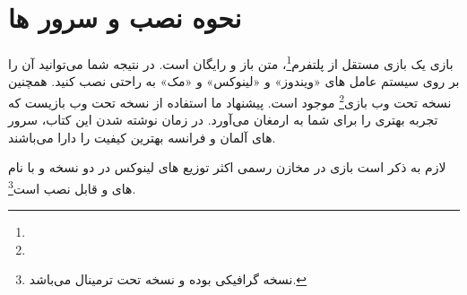 \chapter*{نحوه نصب و سرور ها}

بازی  یک بازی مستقل از پلتفرم\footnote{}، متن باز و رایگان است. در نتیجه شما می‌توانید آن را بر روی سیستم عامل های «ویندوز» و «لینوکس» و «مک» به راحتی نصب کنید. همچنین نسخه تحت وب بازی\footnote{} موجود است. پیشنهاد ما  استفاده از نسخه تحت وب بازیست که تجربه بهتری را برای شما به ارمغان می‌آورد. در زمان نوشته شدن این کتاب، سرور های آلمان و فرانسه بهترین کیفیت را دارا می‌باشند.

لازم به ذکر است بازی در مخازن رسمی اکثر توزیع های لینوکس در دو نسخه  و  با نام های  و  قابل نصب است\footnote{نسخه  گرافیکی بوده و نسخه  تحت ترمینال می‌باشد.}.
